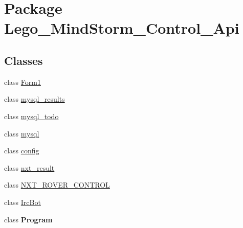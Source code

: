 \hypertarget{namespace_lego___mind_storm___control___api}{
\section{Package Lego\_\-MindStorm\_\-Control\_\-Api}
\label{namespace_lego___mind_storm___control___api}
}
\subsection*{Classes}
\begin{CompactItemize}
\item 
class \hyperlink{class_lego___mind_storm___control___api_1_1_form1}{Form1}
\item 
class \hyperlink{class_lego___mind_storm___control___api_1_1mysql__results}{mysql\_\-results}
\item 
class \hyperlink{class_lego___mind_storm___control___api_1_1mysql__todo}{mysql\_\-todo}
\item 
class \hyperlink{class_lego___mind_storm___control___api_1_1mysql}{mysql}
\item 
class \hyperlink{class_lego___mind_storm___control___api_1_1config}{config}
\item 
class \hyperlink{class_lego___mind_storm___control___api_1_1nxt__result}{nxt\_\-result}
\item 
class \hyperlink{class_lego___mind_storm___control___api_1_1_n_x_t___r_o_v_e_r___c_o_n_t_r_o_l}{NXT\_\-ROVER\_\-CONTROL}
\item 
class \hyperlink{class_lego___mind_storm___control___api_1_1_irc_bot}{IrcBot}
\item 
class \textbf{Program}
\end{CompactItemize}
